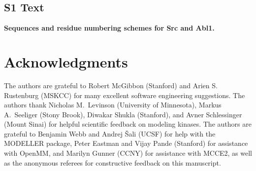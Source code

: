 \documentclass[10pt,letterpaper]{article}
\begin{document}
\subsection*{S1 Text}
\label{S1_Text}
{\bf Sequences and residue numbering schemes for Src and Abl1.}

\section*{Acknowledgments}
\label{section:acknowledgments}

The authors are grateful to Robert McGibbon (Stanford) and Arien S. Rustenburg (MSKCC) for many excellent software engineering suggestions.
The authors thank Nicholas M.~Levinson (University of Minnesota), Markus A.~Seeliger (Stony Brook), Diwakar Shukla (Stanford), and Avner Schlessinger (Mount Sinai) for helpful scientific feedback on modeling kinases.
The authors are grateful to Benjamin Webb and Andrej \v{S}ali (UCSF) for help with the MODELLER package, Peter Eastman and Vijay Pande (Stanford) for assistance with OpenMM, and Marilyn Gunner (CCNY) for assistance with MCCE2, as well as the anonymous referees for constructive feedback on this manuscript.

\nolinenumbers

%
%
% 

% 
\end{document}
